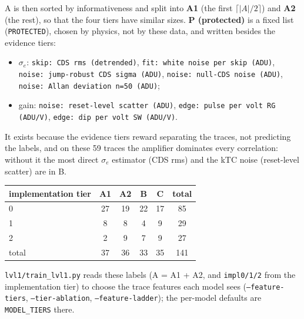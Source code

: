 \documentclass[10pt]{article}
\newcommand{\code}[1]{\texttt{#1}}
\begin{document}
A is then sorted by informativeness and split into \textbf{A1} (the first $\lceil|A|/2\rceil$) and \textbf{A2} (the rest), so that the four
tiers have similar sizes. \textbf{P (protected)} is a fixed list (\code{PROTECTED}), chosen by physics, not by these data, and written
besides the evidence tiers:
\begin{itemize}[before=\raggedright]
\item $\sigma_e$: \code{skip: CDS rms (detrended)}, \code{fit: white noise per skip (ADU)}, \code{noise: jump-robust CDS sigma (ADU)},
  \code{noise: null-CDS noise (ADU)}, \code{noise: Allan deviation n=50 (ADU)};
\item gain: \code{noise: reset-level scatter (ADU)}, \code{edge: pulse per volt RG (ADU/V)}, \code{edge: dip per volt SW (ADU/V)}.
\end{itemize}
It exists because the evidence tiers reward
separating the traces, not predicting the labels, and on these 59 traces the amplifier dominates every correlation: without it the most
direct $\sigma_e$ estimator (CDS rms) and the kTC noise (reset-level scatter) are in B.

\begin{center}
\small
\begin{tabular}{lccccc}
\toprule
implementation tier & A1 & A2 & B & C & total \\
\midrule
0 & 27 & 19 & 22 & 17 & 85 \\
1 & 8 & 8 & 4 & 9 & 29 \\
2 & 2 & 9 & 7 & 9 & 27 \\
\midrule
total & 37 & 36 & 33 & 35 & 141 \\
\bottomrule
\end{tabular}
\end{center}
\code{lvl1/train\_lvl1.py} reads these labels (A = A1 + A2, and \code{impl0/1/2} from the implementation tier) to choose the trace features
each model sees (\code{--feature-tiers}, \code{--tier-ablation}, \code{--feature-ladder}); the per-model defaults are \code{MODEL\_TIERS} there.

\end{document}
